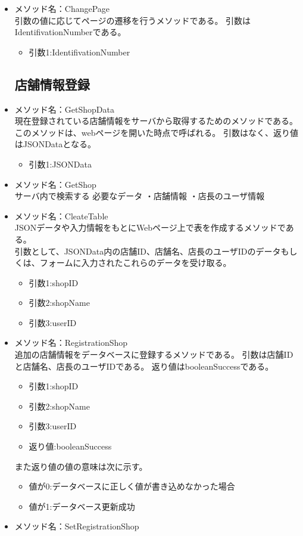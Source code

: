 \documentclass[a4j]{jarticle}
\begin{document}
\begin{itemize}
\item メソッド名：ChangePage\\

引数の値に応じてページの遷移を行うメソッドである。
引数はIdentifivationNumberである。

	\begin{itemize}
		\item 引数1:IdentifivationNumber
	\end{itemize}
	
\subsection{店舗情報登録}
%
\item メソッド名：GetShopData\\

現在登録されている店舗情報をサーバから取得するためのメソッドである。このメソッドは、webページを開いた時点で呼ばれる。
引数はなく、返り値はJSONDataとなる。
	\begin{itemize}
		\item 引数1:JSONData
	\end{itemize}
\item メソッド名：GetShop\\

サーバ内で検索する
必要なデータ
・店舗情報
・店長のユーザ情報

\item メソッド名：CleateTable\\
JSONデータや入力情報をもとにWebページ上で表を作成するメソッドである。\\
引数として、JSONData内の店舗ID、店舗名、店長のユーザIDのデータもしくは、フォームに入力されたこれらのデータを受け取る。
	\begin{itemize}
		\item 引数1:shopID
		\item 引数2:shopName
		\item 引数3:userID
	\end{itemize}
\item メソッド名：RegistrationShop\\

追加の店舗情報をデータベースに登録するメソッドである。
引数は店舗IDと店舗名、店長のユーザIDである。
返り値はbooleanSuccessである。
	\begin{itemize}
		\item 引数1:shopID
		\item 引数2:shopName
		\item 引数3:userID
		\item 返り値:booleanSuccess
	\end{itemize}
また返り値の値の意味は次に示す。
	\begin{itemize}
		\item 値が0:データベースに正しく値が書き込めなかった場合
		\item 値が1:データベース更新成功
	\end{itemize}
\item メソッド名：SetRegistrationShop\\



\end{itemize}
\end{document}
